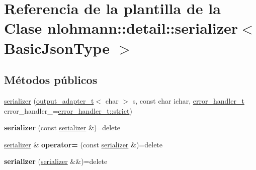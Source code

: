 \hypertarget{classnlohmann_1_1detail_1_1serializer}{}\section{Referencia de la plantilla de la Clase nlohmann\+:\+:detail\+:\+:serializer$<$ Basic\+Json\+Type $>$}
\label{classnlohmann_1_1detail_1_1serializer}
\subsection*{Métodos públicos}
\begin{DoxyCompactItemize}
\item 
\mbox{\hyperlink{classnlohmann_1_1detail_1_1serializer_ac010525281d97867ee842da37294fe83}{serializer}} (\mbox{\hyperlink{namespacenlohmann_1_1detail_a9b680ddfb58f27eb53a67229447fc556}{output\+\_\+adapter\+\_\+t}}$<$ char $>$ s, const char ichar, \mbox{\hyperlink{namespacenlohmann_1_1detail_a5a76b60b26dc8c47256a996d18d967df}{error\+\_\+handler\+\_\+t}} error\+\_\+handler\+\_\+=\mbox{\hyperlink{namespacenlohmann_1_1detail_a5a76b60b26dc8c47256a996d18d967dfa2133fd717402a7966ee88d06f9e0b792}{error\+\_\+handler\+\_\+t\+::strict}})
\item 
\mbox{\label{classnlohmann_1_1detail_1_1serializer_ae3771351ec4cb892bec707edeb56dc31}} 
{\bfseries serializer} (const \mbox{\hyperlink{classnlohmann_1_1detail_1_1serializer}{serializer}} \&)=delete
\item 
\mbox{\label{classnlohmann_1_1detail_1_1serializer_a5f14c33012477b9f9876dc54d97009a0}} 
\mbox{\hyperlink{classnlohmann_1_1detail_1_1serializer}{serializer}} \& {\bfseries operator=} (const \mbox{\hyperlink{classnlohmann_1_1detail_1_1serializer}{serializer}} \&)=delete
\item 
\mbox{\label{classnlohmann_1_1detail_1_1serializer_a28081304e70cca6b3042c101ee5c498c}} 
{\bfseries serializer} (\mbox{\hyperlink{classnlohmann_1_1detail_1_1serializer}{serializer}} \&\&)=delete
\item 
\mbox{\label{classnlohmann_1_1detail_1_1serializer_acaafe3436ee5fb74777eb4132a88c513}} 

\end{DoxyCompactItemize}

